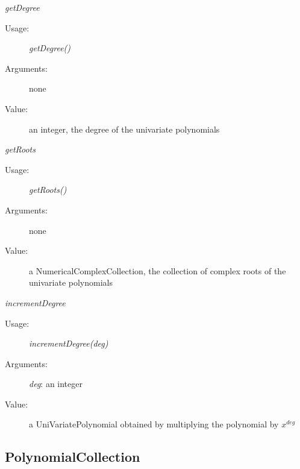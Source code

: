 \begin{description}
\begin{description}
\item \textit{getDegree}
\begin{description}
\item[Usage:] \textit{getDegree()}
\item[Arguments:] none
\item[Value:] an integer, the degree of the univariate polynomials
\end{description}
\bigskip

\item \textit{getRoots}
\begin{description}
\item[Usage:] \textit{getRoots()}
\item[Arguments:] none
\item[Value:] a NumericalComplexCollection, the collection of complex roots of the univariate polynomials
\end{description}
\bigskip

\item \textit{incrementDegree}
\begin{description}
\item[Usage:] \textit{incrementDegree(deg)}
\item[Arguments:] \textit{deg}: an integer
\item[Value:] a UniVariatePolynomial obtained by multiplying the polynomial by $x^{deg}$
\end{description}

\end{description}

\end{description}





\newpage
\subsection{PolynomialCollection}

